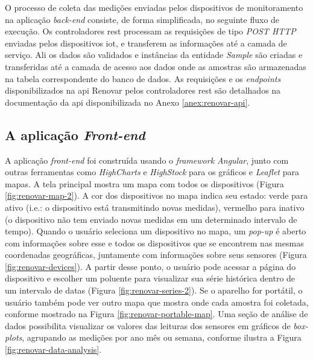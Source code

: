 O processo de coleta das medições enviadas pelos dispositivos de monitoramento na aplicação \textit{back-end} consiste, de forma simplificada, no seguinte fluxo de execução. Os controladores \acrshort{rest} processam as requisições de tipo \textit{POST HTTP} enviadas pelos dispositivos \acrshort{iot}, e transferem as informações até a camada de serviço. Ali os dados são validados e instâncias da entidade \textit{Sample} são criadas e transferidas até a camada de acesso aos dados onde as amostras são armazenadas na tabela correspondente do banco de dados. As requisições e os \textit{endpoints} disponibilizados na \acrshort{api} Renovar pelos controladores \acrshort{rest} são detalhados na documentação da \acrshort{api} disponibilizada no Anexo \ref{anex:renovar-api}.

\subsection{A aplicação \textit{Front-end}}

A aplicação \textit{front-end} foi construída usando o \textit{framework Angular}, junto com outras ferramentas como \textit{HighCharts} e \textit{HighStock} para os gráficos e \textit{Leaflet} para mapas. A tela principal mostra um mapa com todos os dispositivos (Figura \ref{fig:renovar-map-2}). A cor dos dispositivos no mapa indica seu estado: verde para ativo (i.e.: o dispositivo está transmitindo novas medidas), vermelho para inativo (o dispositivo não tem enviado novas medidas em um determinado intervalo de tempo). Quando o usuário seleciona um dispositivo no mapa, um \textit{pop-up} é aberto com informações sobre esse e todos os dispositivos que se encontrem nas mesmas coordenadas geográficas, juntamente com informações sobre seus sensores (Figura \ref{fig:renovar-devices}). A partir desse ponto, o usuário pode acessar a página do dispositivo e escolher um poluente para visualizar sua série histórica dentro de um intervalo de datas (Figura \ref{fig:renovar-series-2}). Se o aparelho for portátil, o usuário também pode ver outro mapa que mostra onde cada amostra foi coletada, conforme mostrado na Figura \ref{fig:renovar-portable-map}. Uma seção de análise de dados possibilita visualizar os valores das leituras dos sensores em gráficos de \textit{box-plots}, agrupando as medições por ano mês ou semana, conforme ilustra a Figura \ref{fig:renovar-data-analysis}.

